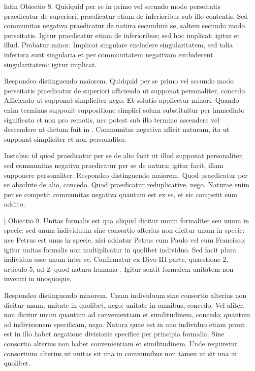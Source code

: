 \begin{otherlanguage*}{latin}
\pstart
Obiectio 8. Quidquid per se in primo vel secundo modo perseitatis praedicatur de superiori, praedicatur etiam de inferioribus sub illo contentis. Sed communitas negativa praedicatur de natura secundum se, saltem secundo modo perseitatis. Igitur praedicatur etiam de inferioribus; sed hoc implicat:
igitur et illud. Probatur minor. Implicat singulare excludere singularitatem, sed talia inferiora sunt singularia et per communitatem negativam excluderent singularitatem:
igitur implicat. 
\pend

\pstart
Respondeo distinguendo maiorem. Quidquid per se primo vel secundo modo perseitatis praedicatur de superiori afficiendo ut supponat personaliter, concedo. Afficiendo ut supponat simpliciter nego. Et solutio applicetur minori. Quando enim terminus supponit suppositione simplici solum substituitur per immediato significato et non pro remotis, nec potest sub illo termino ascendere vel descendere ut dictum fuit in . Communitas negativa afficit naturam, ita ut supponat simpliciter et non personaliter. 
\pend

\pstart
Instabis:
id quod praedicatur per se de alio facit ut illud supponat personaliter, sed communitas negativa praedicatur per se de natura:
igitur facit, illam supponere personaliter. Respondeo distinguendo maiorem. Quod praedicatur per se absolute de alio, concedo. Quod praedicatur reduplicative, nego. Naturae enim per se competit communitas negativa quantum est ex se, et sic competit eum addito. 
\pend

\pstart
\textnormal{|} Obiectio 9. Unitas formalis est qua aliquid dicitur unum formaliter seu unum in specie; sed unum individuum sine consortio alterius non dicitur unum in specie; nec Petrus est unus in specie, nisi addatur Petrus cum Paulo vel cum Francisco; igitur unitas formalis non multiplicatur in quolibet individuo. Sed facit plura individua esse unum inter se. Confirmatur ex Divo  III parte, quaestione 2, articulo 5, ad 2:
quod natura humana . Igitur sentit formalem unitatem non inveniri in unoquoque. 
\pend

\pstart
Respondeo distinguendo minorem. Unum individuum sine consortio alterius non dicitur unum, unitate in quolibet, nego; unitate in omnibus, concedo. Vel aliter, non dicitur unum quantum ad convenientiam et similitudinem, concedo; quantum ad indivisionem specificam, nego. Natura quae est in uno individuo etiam prout est in illo habet negatione divisionis specifice per principia formalia. Sine consortio alterius non habet convenientiam et similitudinem. Unde requiretur consortium alterius ut unitas sit una in communibus non tamen ut sit una in quolibet. 
\pend


\end{otherlanguage*}
